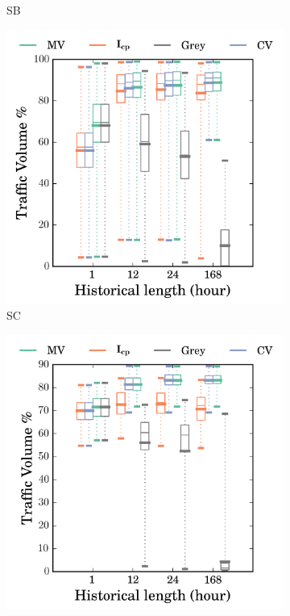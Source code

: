 \begin{figure}
\begin{subfigure}[b]{0.48\textwidth}
                \caption{SB}
                \label{fig:cvg_sb}
        \end{subfigure}
        \begin{subfigure}[b]{0.48\textwidth}
                \includegraphics[width=\textwidth]{gfx/chap2/grey_cvg_box_method_compare_fs_sc.png}
                \caption{SC}
                \label{fig:cvg_sc}
        \end{subfigure}
        \begin{subfigure}[b]{0.48\textwidth}
                \includegraphics[width=\textwidth]{gfx/chap2/grey_cvg_box_method_compare_fs_sd.png}

\end{subfigure}
\end{figure}
